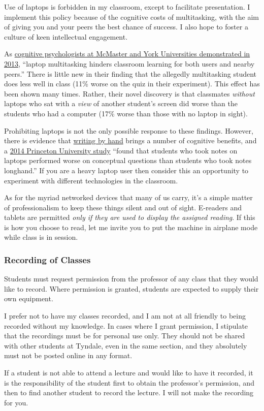 Use of laptops is forbidden in my classroom, except to facilitate presentation.
I implement this policy because of the cognitive costs of multitasking, with the
aim of giving you and your peers the best chance of success. I also hope to
foster a culture of keen intellectual engagement.

As \href{http://dx.doi.org/10.1016/j.compedu.2012.10.003}{cognitive
psychologists at McMaster and York Universities demonstrated in 2013}, ``laptop
multitasking hinders classroom learning for both users and nearby peers.'' There
is little new in their finding that the allegedly multitasking student does less
well in class (11\% worse on the quiz in their experiment). This effect has been
shown many times. Rather, their novel discovery is that classmates
\emph{without} laptops who sat with a \emph{view} of another student's screen
did worse than the students who had a computer (17\% worse than those with no
laptop in sight).

Prohibiting laptops is not the only possible response to these findings.
However, there is evidence that \href{http://on.wsj.com/pjtJaK}{writing by hand}
brings a number of cognitive benefits, and a
\href{http://dx.doi.org/10.1177/0956797614524581}{2014 Princeton University
study} ``found that students who took notes on laptops performed worse on
conceptual questions than students who took notes longhand.'' If you are a heavy
laptop user then consider this an opportunity to experiment with different
technologies in the classroom.

As for the myriad networked devices that many of us carry, it's a simple matter
of professionalism to keep these things silent and out of sight. E-readers and
tablets are permitted \emph{only if they are used to display the assigned
reading}. If this is how you choose to read, let me invite you to put the
machine in airplane mode while class is in session.

\subsubsection{Recording of Classes}
\label{recording}

Students must request permission from the professor of any class that they would
like to record. Where permission is granted, students are expected to supply
their own equipment.

I prefer not to have my classes recorded, and I am not at all friendly to being
recorded without my knowledge. In cases where I grant permission, I stipulate
that the recordings must be for personal use only. They should not be shared
with other students at Tyndale, even in the same section, and they absolutely
must not be posted online in any format.

If a student is not able to attend a lecture and would like to have it recorded,
it is the responsibility of the student first to obtain the professor's
permission, and then to find another student to record the lecture. I will not
make the recording for you.